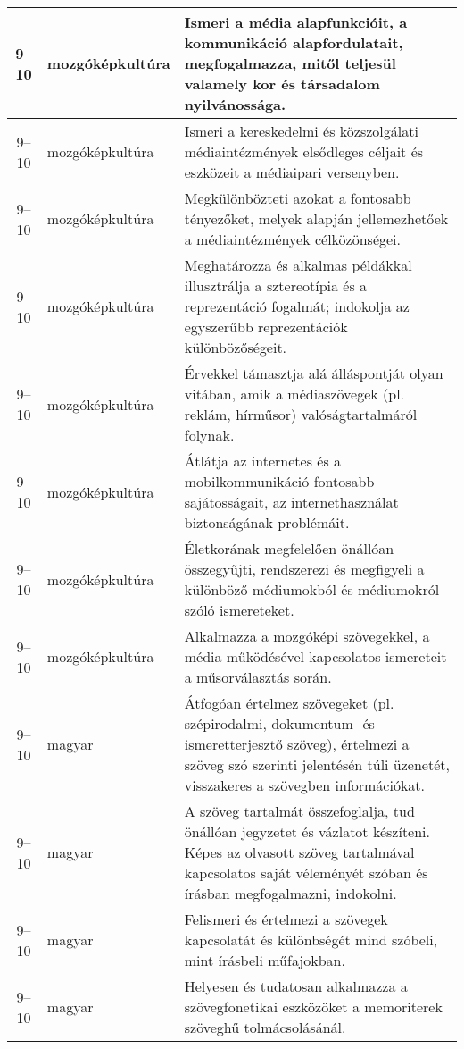 \begin{small}
\begin{longtable}{c | p{2cm} |  p{11cm} }
              9--10 & mozgókép\-kultúra & Ismeri a média alapfunkcióit, a kommunikáció alapfordulatait, megfogalmazza, mitől teljesül valamely kor és társadalom nyilvánossága. \\ \hline
              9--10 & mozgókép\-kultúra & Ismeri a kereskedelmi és közszolgálati médiaintézmények elsődleges céljait és eszközeit a médiaipari versenyben. \\ \hline
              9--10 & mozgókép\-kultúra & Megkülönbözteti azokat a fontosabb tényezőket, melyek alapján jellemezhetőek a médiaintézmények célközönségei. \\ \hline
              9--10 & mozgókép\-kultúra & Meghatározza és alkalmas példákkal illusztrálja a sztereotípia és a reprezentáció fogalmát; indokolja az egyszerűbb reprezentációk különbözőségeit. \\ \hline
              9--10 & mozgókép\-kultúra & Érvekkel támasztja alá álláspontját olyan vitában, amik a médiaszövegek (pl. reklám, hírműsor) valóságtartalmáról folynak. \\ \hline
              9--10 & mozgókép\-kultúra & Átlátja az internetes és a mobilkommunikáció fontosabb sajátosságait, az internethasználat biztonságának problémáit. \\ \hline
              9--10 & mozgókép\-kultúra & Életkorának megfelelően önállóan összegyűjti, rendszerezi és megfigyeli a különböző  médiumokból és médiumokról szóló ismereteket. \\ \hline
              9--10 & mozgókép\-kultúra & Alkalmazza a mozgóképi szövegekkel, a média működésével kapcsolatos ismereteit a műsorválasztás során.  \\ \hline
              9--10 & magyar & Átfogóan értelmez szövegeket (pl. szépirodalmi, dokumentum- és ismeretterjesztő szöveg), értelmezi a szöveg szó szerinti jelentésén túli üzenetét, visszakeres a szövegben információkat. \\ \hline
              9--10 & magyar & A szöveg tartalmát összefoglalja, tud önállóan jegyzetet és vázlatot készíteni. Képes az olvasott szöveg tartalmával kapcsolatos saját véleményét szóban és írásban megfogalmazni, indokolni. \\ \hline
              9--10 & magyar & Felismeri és értelmezi a szövegek kapcsolatát és különbségét mind szóbeli, mint írásbeli műfajokban. \\ \hline
              9--10 & magyar & Helyesen és tudatosan alkalmazza a szövegfonetikai eszközöket a  memoriterek szöveghű tolmácsolásánál. \\ \hline

\end{longtable}
\end{small}
